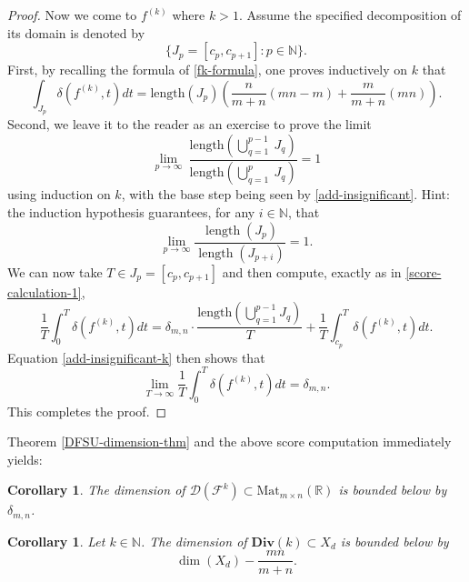 \documentclass[reqno,11pt]{amsart}
\theoremstyle{plain}
\newtheorem{cor}[thm]{Corollary}
\theoremstyle{definition}
\theoremstyle{remark}
\numberwithin{equation}{section}
\newcommand{\D}{\mathbf{Div}}
\newcommand{\R}{{\mathbb{R}}}
\newcommand{\N}{{\mathbb{N}}}
\begin{document}
\begin{proof}
Now we come to $f^{(k)}$ where $k>1$. Assume the specified decomposition of its domain is denoted by
\begin{equation*}
    \{J_p =[c_p,c_{p+1}]: p \in \N\}.
\end{equation*}
First, by recalling the formula of \eqref{fk-formula}, one proves inductively on $k$ that
\begin{equation}
    \int_{J_p} \delta(f^{(k)},t) dt = \text{length}(J_p) \left(\frac{n}{m+n} (mn-m) + \frac{m}{m+n} (mn)\right).
\end{equation}
Second, we leave it to the reader as an exercise to prove the limit
\begin{equation}\label{add-insignificant-k}
    \lim_{p\to \infty}\ 
    \frac{\text{length}\left(\bigcup^{p-1}_{q=1}\ J_q\right)}{\text{length}\left(\bigcup^{p}_{q=1}\ J_q\right)}
    = 1
\end{equation}
using induction on $k$, with the base step being seen by \eqref{add-insignificant}.
Hint: the induction hypothesis guarantees, for any $i \in \N$, that
\begin{equation*}
    \lim_{p \to \infty} \frac{\operatorname{length}(J_{p})}{\operatorname{length}(J_{p+i})} = 1.
\end{equation*}
We can now take $T \in J_p = [c_p, c_{p+1}]$ and then compute, exactly as in \eqref{score-calculation-1},
\begin{equation}
    \frac{1}{T} \int_0^T \delta(f^{(k)},t) dt = \delta_{m,n} \cdot\frac{\text{length}\left(\bigcup_{q=1}^{p-1} J_q\right)}{T} + \frac{1}{T} \int_{c_p}^T \delta(f^{(k)},t) dt.
\end{equation}
Equation \eqref{add-insignificant-k} then shows that 
\begin{equation*}
    \lim_{T\to \infty} \frac{1}{T} \int_0^T \delta(f^{(k)}, t) dt = \delta_{m,n}.
\end{equation*}
This completes the proof.
\end{proof}
Theorem \ref{DFSU-dimension-thm} and the above score computation immediately yields:
\begin{cor}\label{cor-lower bound 1}
The dimension of $\mathcal{D}(\mathcal{F}^k) \subset \text{Mat}_{m\times n}(\R)$ is bounded below by $\delta_{m,n}$.
\end{cor}
\begin{cor}\label{lower-bound-cor}
Let $k \in \N$. The dimension of $\D(k) \subset X_d$ is bounded below by
\begin{equation}
    \dim(X_d) - \frac{mn}{m+n}.
\end{equation}
\end{cor}
\end{document}
